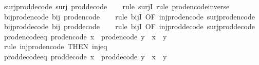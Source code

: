 \begin{isabellebody}
\isamarkupfalse%
\ surj{\isacharunderscore}prod{\isacharunderscore}decode{\isacharcolon}\ {\isachardoublequoteopen}surj\ prod{\isacharunderscore}decode{\isachardoublequoteclose}\isanewline
%
\isadelimproof
\ \ %
\endisadelimproof
%
\isatagproof
{}\isamarkupfalse%
\ {\isacharparenleft}rule\ surjI{\isacharparenright}\ {\isacharparenleft}rule\ prod{\isacharunderscore}encode{\isacharunderscore}inverse{\isacharparenright}%
\endisatagproof
{\isafoldproof}%
%
\isadelimproof
\isanewline
%
\endisadelimproof
\isanewline
{}\isamarkupfalse%
\ bij{\isacharunderscore}prod{\isacharunderscore}encode{\isacharcolon}\ {\isachardoublequoteopen}bij\ prod{\isacharunderscore}encode{\isachardoublequoteclose}\isanewline
%
\isadelimproof
\ \ %
\endisadelimproof
%
\isatagproof
{}\isamarkupfalse%
\ {\isacharparenleft}rule\ bijI\ {\isacharbrackleft}OF\ inj{\isacharunderscore}prod{\isacharunderscore}encode\ surj{\isacharunderscore}prod{\isacharunderscore}encode{\isacharbrackright}{\isacharparenright}%
\endisatagproof
{\isafoldproof}%
%
\isadelimproof
\isanewline
%
\endisadelimproof
\isanewline
{}\isamarkupfalse%
\ bij{\isacharunderscore}prod{\isacharunderscore}decode{\isacharcolon}\ {\isachardoublequoteopen}bij\ prod{\isacharunderscore}decode{\isachardoublequoteclose}\isanewline
%
\isadelimproof
\ \ %
\endisadelimproof
%
\isatagproof
{}\isamarkupfalse%
\ {\isacharparenleft}rule\ bijI\ {\isacharbrackleft}OF\ inj{\isacharunderscore}prod{\isacharunderscore}decode\ surj{\isacharunderscore}prod{\isacharunderscore}decode{\isacharbrackright}{\isacharparenright}%
\endisatagproof
{\isafoldproof}%
%
\isadelimproof
\isanewline
%
\endisadelimproof
\isanewline
{}\isamarkupfalse%
\ prod{\isacharunderscore}encode{\isacharunderscore}eq{\isacharcolon}\ {\isachardoublequoteopen}prod{\isacharunderscore}encode\ x\ {\isacharequal}\ prod{\isacharunderscore}encode\ y\ {\isasymlongleftrightarrow}\ x\ {\isacharequal}\ y{\isachardoublequoteclose}\isanewline
%
\isadelimproof
\ \ %
\endisadelimproof
%
\isatagproof
{}\isamarkupfalse%
\ {\isacharparenleft}rule\ inj{\isacharunderscore}prod{\isacharunderscore}encode\ {\isacharbrackleft}THEN\ inj{\isacharunderscore}eq{\isacharbrackright}{\isacharparenright}%
\endisatagproof
{\isafoldproof}%
%
\isadelimproof
\isanewline
%
\endisadelimproof
\isanewline
{}\isamarkupfalse%
\ prod{\isacharunderscore}decode{\isacharunderscore}eq{\isacharcolon}\ {\isachardoublequoteopen}prod{\isacharunderscore}decode\ x\ {\isacharequal}\ prod{\isacharunderscore}decode\ y\ {\isasymlongleftrightarrow}\ x\ {\isacharequal}\ y{\isachardoublequoteclose}\isanewline

\end{isabellebody}
